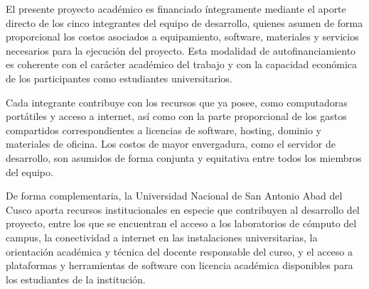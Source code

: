 El presente proyecto académico es financiado íntegramente mediante el aporte
directo de los cinco integrantes del equipo de desarrollo, quienes asumen de
forma proporcional los costos asociados a equipamiento, software, materiales y
servicios necesarios para la ejecución del proyecto. Esta modalidad de
autofinanciamiento es coherente con el carácter académico del trabajo y con la
capacidad económica de los participantes como estudiantes universitarios.

Cada integrante contribuye con los recursos que ya posee, como computadoras
portátiles y acceso a internet, así como con la parte proporcional de los
gastos compartidos correspondientes a licencias de software, hosting, dominio
y materiales de oficina. Los costos de mayor envergadura, como el servidor de
desarrollo, son asumidos de forma conjunta y equitativa entre todos los
miembros del equipo.

De forma complementaria, la Universidad Nacional de San Antonio Abad del Cusco
aporta recursos institucionales en especie que contribuyen al desarrollo del
proyecto, entre los que se encuentran el acceso a los laboratorios de cómputo
del campus, la conectividad a internet en las instalaciones universitarias, la
orientación académica y técnica del docente responsable del curso, y el acceso
a plataformas y herramientas de software con licencia académica disponibles
para los estudiantes de la institución.
